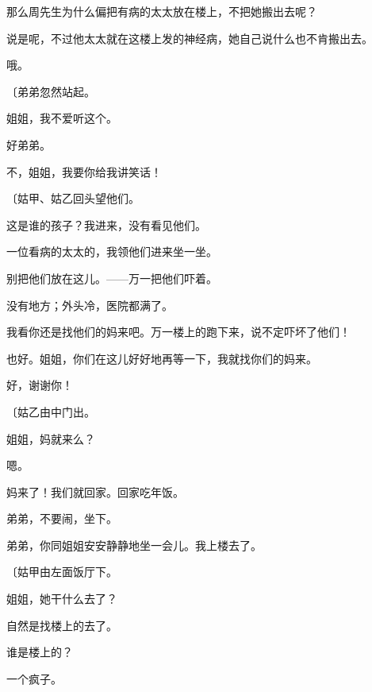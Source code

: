 那么周先生为什么偏把有病的太太放在楼上，不把她搬出去呢？

说是呢，不过他太太就在这楼上发的神经病，她自己说什么也不肯搬出去。

哦。

{\fangsong〔弟弟忽然站起。}

姐姐，我不爱听这个。

好弟弟。

不，姐姐，我要你给我讲笑话！

{\fangsong〔姑甲、姑乙回头望他们。}

这是谁的孩子？我进来，没有看见他们。

一位看病的太太的，我领他们进来坐一坐。

别把他们放在这儿。——万一把他们吓着。

没有地方；外头冷，医院都满了。

我看你还是找他们的妈来吧。万一楼上的跑下来，说不定吓坏了他们！

也好。姐姐，你们在这儿好好地再等一下，我就找你们的妈来。

好，谢谢你！

{\fangsong〔姑乙由中门出。}

姐姐，妈就来么？

嗯。

妈来了！我们就回家。回家吃年饭。

弟弟，不要闹，坐下。

弟弟，你同姐姐安安静静地坐一会儿。我上楼去了。

{\fangsong〔姑甲由左面饭厅下。}

姐姐，她干什么去了？

自然是找楼上的去了。

谁是楼上的？

一个疯子。

